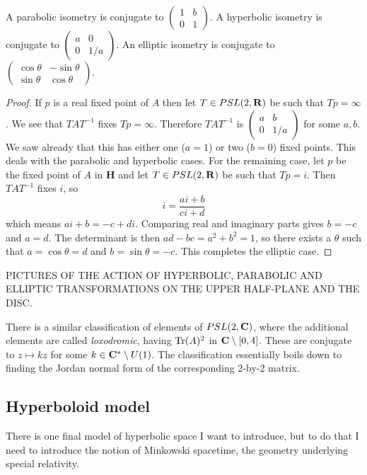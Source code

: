 \documentclass[12pt]{article}
\begin{document}
\begin{lma}
  A parabolic isometry is conjugate to $\left(\begin{array}{cc}1&b\\0&1\end{array}\right)$. A hyperbolic isometry is conjugate to $\left(\begin{array}{cc}a&0\\0&1/a\end{array}\right)$. An elliptic isometry is conjugate to $\left(\begin{array}{cc}\cos\theta&-\sin\theta\\\sin\theta&\cos\theta\end{array}\right)$.
\end{lma}
\begin{proof}
  If $p$ is a real fixed point of $A$ then let $T\in PSL(2,\mathbf{R})$ be such that $Tp=\infty$. We see that $TAT^{-1}$ fixes $Tp=\infty$. Therefore $TAT^{-1}$ is $\left(\begin{array}{cc}a&b\\0&1/a\end{array}\right)$ for some $a,b$. We saw already that this has either one ($a=1$) or two ($b=0$) fixed points. This deals with the parabolic and hyperbolic cases. For the remaining case, let $p$ be the fixed point of $A$ in $\mathbf{H}$ and let $T\in PSL(2,\mathbf{R})$ be such that $Tp=i$. Then $TAT^{-1}$ fixes $i$, so
  \[i=\frac{ai+b}{ci+d}\]
  which means $ai+b=-c+di$. Comparing real and imaginary parts gives $b=-c$ and $a=d$. The determinant is then $ad-bc=a^2+b^2=1$, so there exists a $\theta$ such that $a=\cos\theta=d$ and $b=\sin\theta=-c$. This completes the elliptic case.
\end{proof}

PICTURES OF THE ACTION OF HYPERBOLIC, PARABOLIC AND ELLIPTIC TRANSFORMATIONS ON THE UPPER HALF-PLANE AND THE DISC.

There is a similar classification of elements of $PSL(2,\mathbf{C})$, where the additional elements are called {\em loxodromic}, having $\operatorname{Tr}(A)^2$ in $\mathbf{C}\setminus [0,4]$. These are conjugate to $z\mapsto kz$ for some $k\in\mathbf{C}^*\setminus U(1)$. The classification essentially boils down to finding the Jordan normal form of the corresponding 2-by-2 matrix.

\subsection{Hyperboloid model}

There is one final model of hyperbolic space I want to introduce, but to do that I need to introduce the notion of Minkowski spacetime, the geometry underlying special relativity.
\end{document}
